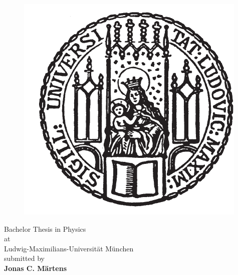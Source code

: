 \begin{titlepage}
\begin{center}
        \begin{figure}[h]
            \begin{center}
                \hspace*{-0.73cm}
                \includegraphics{lmu_siegel}
            \end{center}
            \label{fig:lmulogo}
        \end{figure}
        \vspace*{0.5cm}
        \Large
        \hspace*{-0.73cm}
        \hspace*{-0.5cm}Bachelor Thesis in Physics\\
        \vspace*{0.1cm}
        \hspace*{-0.73cm}
        \hspace*{-0.5cm}at\\
        \vspace*{0.1cm}
        \hspace*{-0.73cm}
        \hspace*{-0.5cm}Ludwig-Maximilians-Universität München\\
        \vspace*{3.5cm}
        \large
        \hspace*{-0.73cm}
        \hspace*{-0.8cm} submitted by\\
        \vspace*{0.1cm}
        \hspace*{-0.73cm}
        \hspace*{-0.7cm}\Large \textbf{Jonas C. Märtens}\\

    \end{center}
\end{titlepage}

